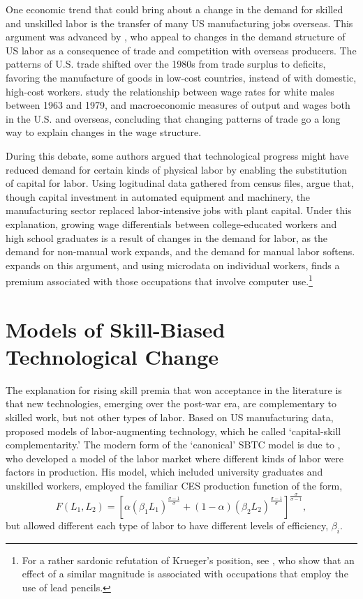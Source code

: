 One economic trend that could bring about a change in the demand for skilled and unskilled labor is the transfer of many US manufacturing jobs overseas. This argument was advanced by \citet{Murphy1992}, who appeal to changes in the demand structure of US labor as a consequence of trade and competition with overseas producers. The patterns of U.S. trade shifted over the 1980s from trade surplus to deficits, favoring the manufacture of goods in low-cost countries, instead of with domestic, high-cost workers.  study the relationship between wage rates for white males between 1963 and 1979, and macroeconomic measures of output and wages both in the U.S. and overseas, concluding that changing patterns of trade go a long way to explain changes in the wage structure.

During this debate, some authors argued that technological progress might have reduced demand for certain kinds of physical labor by enabling the substitution of capital for labor. Using logitudinal data gathered from census files, \citet{Davis1991} argue that, though capital investment in automated equipment and machinery, the manufacturing sector replaced labor-intensive jobs with plant capital. Under this explanation, growing wage differentials between college-educated workers and high school graduates is a result of changes in the demand for labor, as the demand for non-manual work expands, and the demand for manual labor softens. \citet{Krueger1993} expands on this argument, and using microdata on individual workers, finds a premium associated with those occupations that involve computer use.\footnote{For a rather sardonic refutation of Krueger's position, see \citet{DiNardo1997}, who show that an effect of a similar magnitude is associated with occupations that employ the use of lead pencils.} 

\section{Models of Skill-Biased Technological Change}

The explanation for rising skill premia that won acceptance in the literature is that new technologies, emerging over the post-war era, are complementary to skilled work, but not other types of labor. Based on US manufacturing data, \citet{Griliches1969} proposed models of labor-augmenting technology, which he called `capital-skill complementarity.' The modern form of the `canonical' SBTC model is due to \citet{Tinbergen1974,Tinbergen1975}, who developed a model of the labor market where different kinds of labor were factors in production. His model, which included university graduates and unskilled workers, employed the familiar CES production function of the form,
\begin{equation} F(L_1, L_2) = \left[\alpha (\beta_1L_1)^{\frac{\sigma-1}{\sigma}} + (1-\alpha) (\beta_2L_2)^{\frac{\sigma-1}{\sigma}}\right]^{\frac{\sigma}{\sigma-1}}, \end{equation}
but allowed different each type of labor to have different levels of efficiency, $\beta_i$.

